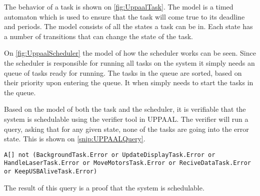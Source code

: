 The behavior of a task is shown on \autoref{fig:UppaalTask}.
The model is a timed automaton which is used to ensure that the task will come true to its deadline and periods.
The model consists of all the states a task can be in.
Each state has a number of transitions that can change the state of the task.


On \autoref{fig:UppaalScheduler} the model of how the scheduler works can be seen.
Since the scheduler is responsible for running all tasks on the system it simply needs an queue of tasks ready for running.
The tasks in the queue are sorted, based on their priority upon entering the queue.
It when simply needs to start the tasks in the queue.


Based on the model of both the task and the scheduler, it is verifiable that the system is schedulable using the verifier tool in UPPAAL.
The verifier will run a query, asking that for any given state, none of the tasks are going into the error state.
This is shown on \autoref{snip:UPPAALQuery}.
\begin{lstlisting}[label={snip:UPPAALQuery},caption={Query from UPPAAL verifier},frame=tlrb,numbers=none]
A[] not (BackgroundTask.Error or UpdateDisplayTask.Error or HandleLaserTask.Error or MoveMotorsTask.Error or ReciveDataTask.Error or KeepUSBAliveTask.Error)
\end{lstlisting}
The result of this query is a proof that the system is schedulable.

